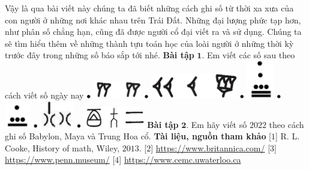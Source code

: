 \begin{multicols}{2}
	\vskip 0.1cm
	Vậy là qua bài viết này chúng ta đã biết những cách ghi số  từ thời xa xưa của con người ở những nơi khác nhau trên Trái Đất. Những đại lượng phức tạp hơn, như phân số chẳng hạn, cũng đã được người cổ đại viết ra và sử dụng. Chúng ta sẽ tìm hiểu thêm về những thành tựu toán học của loài người ở những thời kỳ trước đây trong những số báo sắp tới nhé. 
	\vskip 0.1cm
	\textbf{\color{toancuabi}Bài tập} $\pmb{1.}$
	Em viết các số sau theo cách viết số ngày nay
	\vskip 0.1cm
	$\bullet$ \includegraphics[scale=0.5]{babylon1}
	\vskip 0.1cm
	$\bullet$ \includegraphics[scale=0.42]{babylon2}
	\vskip 0.1cm
	$\bullet$ \includegraphics[scale=0.42]{maya1}
	\vskip 0.1cm
	$\bullet$ \includegraphics[scale=0.42]{maya2}
	\vskip 0.1cm
	$\bullet$ \includegraphics[scale=0.5]{china2}
	\vskip 0.1cm
	$\bullet$ \includegraphics[scale=0.5]{china4}
	\vskip 0.1cm
	\textbf{\color{toancuabi}Bài tập} $\pmb{2.}$ Em hãy viết số $2022$ theo cách ghi số Babylon, Maya và Trung Hoa cổ.
	\vskip 0.1cm
	\textbf{\color{toancuabi}Tài liệu, nguồn tham khảo}
	\vskip 0.1cm
	[$1$] R. L. Cooke, History of math, Wiley, $2013$.
	\vskip 0.1cm
	[$2$] \url{https://www.britannica.com/}
	\vskip 0.1cm
	[$3$] \url{https://www.penn.museum/}
	\vskip 0.1cm
	[$4$] \url{https://www.cemc.uwaterloo.ca}
\end{multicols}
\newpage
\graphicspath{{../toancuabi/pic/}}
\begingroup
